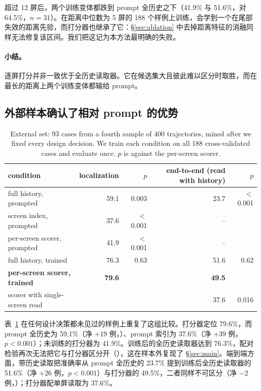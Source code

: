 超过 12 屏后，两个训练变体都跌到 prompt 全历史之下（41.9\% 与 51.6\%，对 64.5\%，$n=31$）。在距离中位数为 5 屏的 188 个样例上训练，会学到一个在尾部失效的距离先验，而打分器也继承了它：\S\ref{sec:ablation} 中去掉距离特征的消融同样无法修复该区间。我们把这记为本方法最明确的失败。

\paragraph{小结。} 逐屏打分并非一致优于全历史读取器。它在候选集大且彼此难以区分时取胜，而在最长的距离上两个训练变体都输给 prompt。

\subsection{外部样本确认了相对 prompt 的优势}
\label{sec:ext}
\begin{table}[t]
\centering\scriptsize\engfont
\caption{\rm External set: 93 cases from a fourth sample of 400 trajectories, mined after we fixed every design decision. We train each condition on all 188 cross-validated cases and evaluate once. $p$ is against the per-screen scorer.}
\label{tab:ext}
\begin{tabular}{lrrrr}
\toprule
condition & localization & $p$ & end-to-end (read with history) & $p$ \\
\midrule
full history, prompted & 59.1 & 0.003 & 23.7 & $<$0.001 \\
screen index, prompted & 37.6 & $<$0.001 & -- & \\
per-screen scorer, prompted & 41.9 & $<$0.001 & -- & \\
full history, trained & 76.3 & 0.63 & 51.6 & 0.62 \\
\textbf{per-screen scorer, trained} & \textbf{79.6} & & \textbf{49.5} & \\
\quad scorer with single-screen read & & & 37.6 & 0.016 \\
\bottomrule
\end{tabular}
\end{table}

表~\ref{tab:ext} 在任何设计决策都未见过的样例上重复了这组比较。打分器定位 79.6\%，而 prompt 全历史为 59.1\%（净 $+19$ 例，）、prompt 索引为 37.6\%（净 $+39$ 例，$p<0.001$）；未训练的打分器为 41.9\%。训练后的全历史读取器达到 76.3\%，配对检验再次无法把它与打分器区分开（），这在样本外复现了 \S\ref{sec:main}。端到端方面，带历史读取把准确率从 prompt 全历史的 23.7\% 提到训练后全历史读取器的 51.6\%（净 $+26$ 例，$p<0.001$）与打分器的 49.5\%，二者同样不可区分（净 $-2$ 例，）；打分器配单屏读取为 37.6\%。

